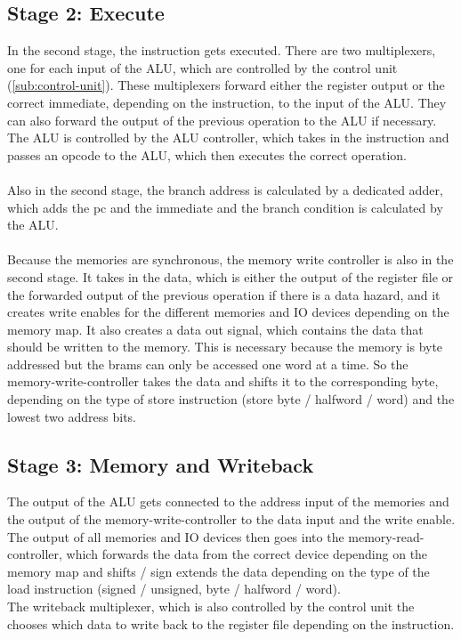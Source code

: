 \documentclass[12pt]{article}
\begin{document}
\subsection{Stage 2: Execute}
In the second stage, the instruction gets executed. There are two multiplexers, one for each input of the ALU, which are controlled by the control unit (\ref{sub:control-unit}). These multiplexers forward either the register output or the correct immediate, depending on the instruction, to the input of the ALU. They can also forward the output of the previous operation to the ALU if necessary. The ALU is controlled by the ALU controller, which takes in the instruction and passes an opcode to the ALU, which then executes the correct operation.\\\\
Also in the second stage, the branch address is calculated by a dedicated adder, which adds the pc and the immediate and the branch condition is calculated by the ALU.\\\\
Because the memories are synchronous, the memory write controller is also in the second stage. It takes in the data, which is either the output of the register file or the forwarded output of the previous operation if there is a data hazard, and it creates write enables for the different memories and IO devices depending on the memory map. It also creates a data out signal, which contains the data that should be written to the memory. This is necessary because the memory is byte addressed but the brams can only be accessed one word at a time. So the memory-write-controller takes the data and shifts it to the corresponding byte, depending on the type of store instruction (store byte / halfword / word) and the lowest two address bits.


\subsection{Stage 3: Memory and Writeback}
The output of the ALU gets connected to the address input of the memories and the output of the memory-write-controller to the data input and the write enable. The output of all memories and IO devices then goes into the memory-read-controller, which forwards the data from the correct device depending on the memory map and shifts / sign extends the data depending on the type of the load instruction (signed / unsigned, byte / halfword / word).\\
The writeback multiplexer, which is also controlled by the control unit the chooses which data to write back to the register file depending on the instruction.
\end{document}
